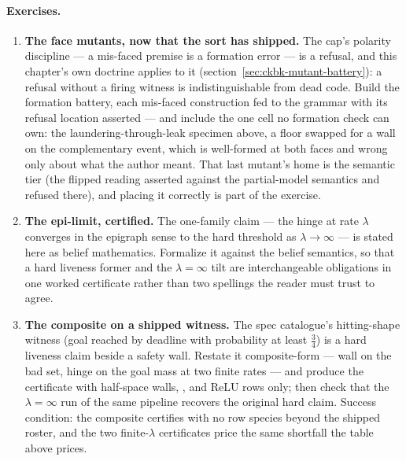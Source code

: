 \paragraph{Exercises.}
\begin{enumerate}
\item \textbf{The face mutants, now that the sort has shipped.} The
  cap's polarity discipline --- a mis-faced premise is a formation
  error --- is a refusal, and this chapter's own doctrine applies to
  it (section~\ref{sec:ckbk-mutant-battery}): a refusal without a
  firing witness is indistinguishable from dead code. Build the
  formation battery, each mis-faced construction fed to the grammar
  with its refusal location asserted --- and include the one cell no
  formation check can own: the laundering-through-leak specimen
  above, a floor swapped for a wall on the complementary event, which
  is well-formed at both faces and wrong only about what the author
  meant. That last mutant's home is the semantic tier (the flipped
  reading asserted against the partial-model semantics and refused
  there), and placing it correctly is part of the exercise.
\item \textbf{The epi-limit, certified.} The one-family claim ---
  the hinge at rate $\lambda$ converges in the epigraph sense to the
  hard threshold as $\lambda \to \infty$ --- is stated here as
  belief mathematics. Formalize it against the belief semantics,
  so that a hard liveness former and the $\lambda = \infty$ tilt are
  interchangeable obligations in one worked certificate rather than
  two spellings the reader must trust to agree.
\item \textbf{The composite on a shipped witness.} The spec
  catalogue's hitting-shape witness (goal reached by deadline with
  probability at least $\tfrac34$) is a hard liveness claim beside a
  safety wall. Restate it composite-form --- wall on the bad set,
  hinge on the goal mass at two finite rates --- and produce the
  certificate with half-space walls, , and ReLU
  rows only; then check that the $\lambda = \infty$ run of the same
  pipeline recovers the original hard claim. Success condition: the
  composite certifies with no row species beyond the shipped roster,
  and the two finite-$\lambda$ certificates price the same shortfall
  the table above prices.
\end{enumerate}
